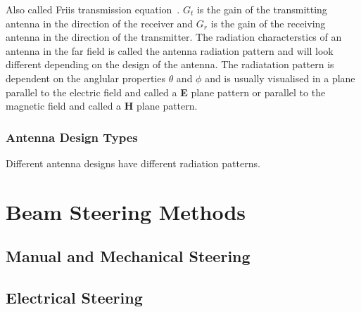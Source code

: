 Also called Friis transmission equation~\cite[pp. 8-10]{ant_eng_hk}. $G_t$ is the gain of the transmitting antenna in the direction of the receiver and $G_r$ is the gain of the receiving antenna in the direction of the transmitter. The radiation characterstics of an antenna in the far field is called the antenna radiation pattern and will look different depending on the design of the antenna. The radiatation pattern is dependent on the anglular properties $\theta$ and $\phi$ and is usually visualised in a plane parallel to the electric field and called a \textbf{E} plane pattern or parallel to the magnetic field and called a \textbf{H} plane pattern.

\subsubsection{Antenna Design Types}
Different antenna designs have different radiation patterns. 


\section{Beam Steering Methods}

\subsection{Manual and Mechanical Steering}

\subsection{Electrical Steering}